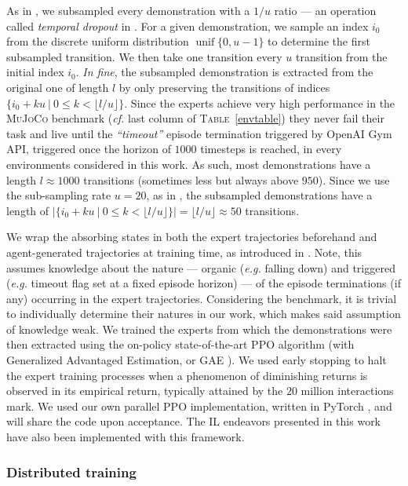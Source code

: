 As in \cite{Ho2016-bv}, we subsampled every demonstration with a $1/u$ ratio ---
an operation called \textit{temporal dropout} in \cite{Duan2017-tg}.
For a given demonstration, we sample an index $i_0$ from the discrete uniform distribution
$\operatorname{unif}\{0, u - 1\}$ to determine the first subsampled transition.
We then take one transition every $u$ transition from the initial index $i_0$.
\textit{In fine}, the subsampled demonstration is extracted from the original one
of length $l$ by only preserving the transitions of indices
$\{i_0 + ku \: | \: 0 \leq k < \lfloor l / u \rfloor\}$.
Since the experts achieve very high performance in the \textsc{MuJoCo} benchmark
(\textit{cf.} last column of \textsc{Table}~\ref{envtable})
they never fail their task and live until the \textit{``timeout''} episode termination
triggered by OpenAI Gym API, triggered once the horizon of $1000$ timesteps is reached,
in every environments considered in this work.
As such, most demonstrations have a length $l \approx 1000$ transitions
(sometimes less but always above $950$).
Since we use the sub-sampling rate $u=20$, as in \cite{Ho2016-bv},
the subsampled demonstrations have a length of
$|\{i_0 + ku \: | \: 0 \leq k < \lfloor l / u \rfloor\}| = \lfloor l / u \rfloor \approx 50$
transitions.

We wrap the absorbing states
in both the expert trajectories beforehand and
agent-generated trajectories at training time,
as introduced in \cite{Kostrikov2019-jo}.
Note, this assumes knowledge about the nature
--- organic (\textit{e.g.} falling down)
and triggered (\textit{e.g.} timeout flag set at a fixed episode horizon) ---
of the episode terminations (if any) occurring in the expert trajectories.
Considering the benchmark,
it is trivial to individually determine their natures in our work,
which makes said assumption of knowledge weak.
We trained the experts from which the demonstrations were then extracted
using the on-policy state-of-the-art PPO \cite{Schulman2017-ou} algorithm
(with Generalized Advantaged Estimation, or GAE \cite{Schulman2016-ym}).
We used early stopping to halt the expert training processes when
a phenomenon of diminishing returns is observed in its empirical return,
typically attained by the $20$ million interactions mark.
We used our own parallel PPO implementation,
written in PyTorch \cite{Paszke2019-zf}, and will share the code upon acceptance.
The IL endeavors presented in this work have also been implemented
with this framework.

\subsubsection{Distributed training}

